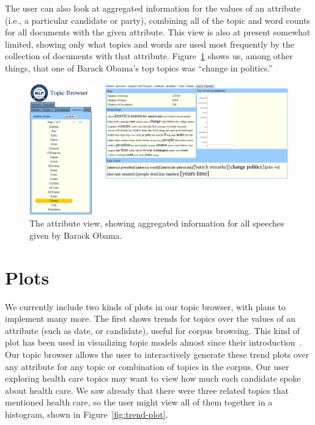 \documentclass{article}
\begin{document}
The user can also look at aggregated information for the values of an attribute
(i.e., a particular candidate or party), combining all of the topic and word
counts for all documents with the given attribute.  This view is also at
present somewhat limited, showing only what topics and words are used most
frequently by the collection of documents with that attribute.
Figure~\ref{fig:attribute} shows us, among other things, that one of Barack
Obama's top topics was ``change in politics.''

\begin{figure}
  \centering
  \includegraphics[width=\textwidth]{attribute}
  \caption{The attribute view, showing aggregated information for all speeches
  given by Barack Obama.}
  \label{fig:attribute}
\end{figure}

\section{Plots}

We currently include two kinds of plots in our topic browser, with plans to
implement many more.  The first shows trends for topics over the values of an
attribute (such as date, or candidate), useful for corpus browsing.  This kind
of plot has been used in visualizing topic models almost since their
introduction~\cite{griffiths-2004-finding-scientific-topics}.  Our topic
browser allows the user to interactively generate these trend plots over any
attribute for any topic or combination of topics in the corpus.  Our user
exploring health care topics may want to view how much each candidate spoke
about health care.  We saw already that there were three related topics that
mentioned health care, so the user might view all of them together in a
histogram, shown in Figure~\ref{fig:trend-plot}.
\end{document}
